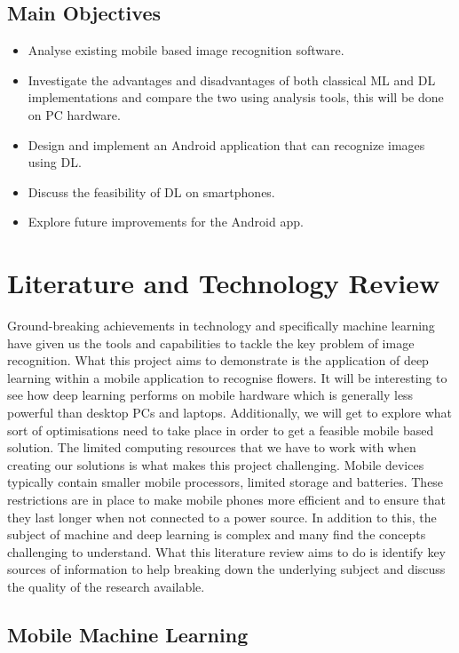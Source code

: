 \documentclass{article}
\begin{document}
\subsection{Main Objectives}
\begin{itemize}
    \item Analyse existing mobile based image recognition software.
    \item Investigate the advantages and disadvantages of both classical ML and DL implementations and compare the two 
using analysis tools, this will be done on PC hardware.
    \item Design and implement an Android application that can recognize images using DL.
    \item Discuss the feasibility of DL on smartphones.
    \item Explore future improvements for the Android app.
\end{itemize}

\clearpage
\section{Literature and Technology Review}

Ground-breaking achievements in technology and specifically machine learning have given us the tools and capabilities to
tackle the key problem of image recognition. What this project aims to demonstrate is the application of deep learning 
within a mobile application to recognise flowers. It will be interesting to see how deep learning performs on mobile 
hardware which is generally less powerful than desktop PCs and laptops. Additionally, we will get to explore what sort 
of optimisations need to take place in order to get a feasible mobile based solution.  The limited computing resources 
that we have to work with when creating our solutions is what makes this project challenging. Mobile devices typically 
contain smaller mobile processors, limited storage and batteries. These restrictions are in place to 
make mobile phones more efficient and to ensure that they last longer when not connected to a power source. In addition
to this, the subject of machine and deep learning is complex and many find the concepts challenging to understand. 
What this literature review aims to do is identify key sources of information to help breaking down the underlying 
subject and discuss the quality of the research available.

\subsection{Mobile Machine Learning}
\end{document}
